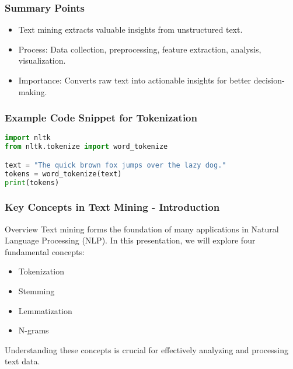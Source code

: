 \documentclass[aspectratio=169]{beamer}
\begin{document}
\begin{frame}[fragile]
    \frametitle{Summary Points}
    \begin{itemize}
        \item Text mining extracts valuable insights from unstructured text.
        \item Process: Data collection, preprocessing, feature extraction, analysis, visualization.
        \item Importance: Converts raw text into actionable insights for better decision-making.
    \end{itemize}
\end{frame}

\begin{frame}[fragile]
    \frametitle{Example Code Snippet for Tokenization}
    \begin{lstlisting}[language=Python]
import nltk
from nltk.tokenize import word_tokenize

text = "The quick brown fox jumps over the lazy dog."
tokens = word_tokenize(text)
print(tokens)
    \end{lstlisting}
\end{frame}

\begin{frame}[fragile]
    \frametitle{Key Concepts in Text Mining - Introduction}
    \begin{block}{Overview}
        Text mining forms the foundation of many applications in Natural Language Processing (NLP). 
        In this presentation, we will explore four fundamental concepts:
        \begin{itemize}
            \item Tokenization
            \item Stemming
            \item Lemmatization
            \item N-grams
        \end{itemize}
        Understanding these concepts is crucial for effectively analyzing and processing text data.
    \end{block}
\end{frame}
\end{document}
